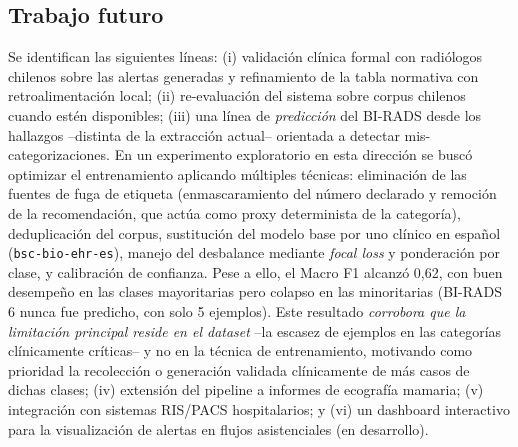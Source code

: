 \documentclass[10pt,journal,a4paper]{IEEEtran}
\begin{document}
\subsection*{Trabajo futuro}
Se identifican las siguientes l\'ineas: (i) validaci\'on cl\'inica formal con radi\'ologos chilenos sobre las alertas generadas y refinamiento de la tabla normativa con retroalimentaci\'on local; (ii) re-evaluaci\'on del sistema sobre corpus chilenos cuando est\'en disponibles; (iii) una l\'inea de \emph{predicci\'on} del BI-RADS desde los hallazgos --distinta de la extracci\'on actual-- orientada a detectar mis-categorizaciones. En un experimento exploratorio en esta direcci\'on se busc\'o optimizar el entrenamiento aplicando m\'ultiples t\'ecnicas: eliminaci\'on de las fuentes de fuga de etiqueta (enmascaramiento del n\'umero declarado y remoci\'on de la recomendaci\'on, que act\'ua como proxy determinista de la categor\'ia), deduplicaci\'on del corpus, sustituci\'on del modelo base por uno cl\'inico en espa\~nol (\texttt{bsc-bio-ehr-es}), manejo del desbalance mediante \emph{focal loss} y ponderaci\'on por clase, y calibraci\'on de confianza. Pese a ello, el Macro F1 alcanz\'o 0,62, con buen desempe\~no en las clases mayoritarias pero colapso en las minoritarias (BI-RADS 6 nunca fue predicho, con solo 5 ejemplos). Este resultado \emph{corrobora que la limitaci\'on principal reside en el dataset} --la escasez de ejemplos en las categor\'ias cl\'inicamente cr\'iticas-- y no en la t\'ecnica de entrenamiento, motivando como prioridad la recolecci\'on o generaci\'on validada cl\'inicamente de m\'as casos de dichas clases; (iv) extensi\'on del pipeline a informes de ecograf\'ia mamaria; (v) integraci\'on con sistemas RIS/PACS hospitalarios; y (vi) un dashboard interactivo para la visualizaci\'on de alertas en flujos asistenciales (en desarrollo).



\end{document}
